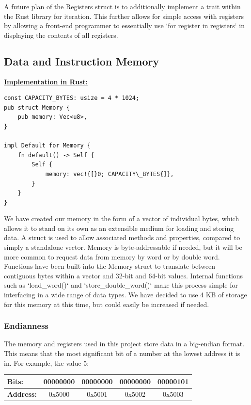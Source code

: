 \documentclass[
    parskip=half,
    fontsize=12pt,
    titlepage=firstiscover,
    toc=bibliography,
    numbers=endperiod
]{scrartcl}
\begin{document}

A future plan of the Registers struct is to additionally implement a
trait within the Rust library for iteration. This further allows for
simple access with registers by allowing a front-end programmer to
essentially use `for register in registers` in displaying the contents
of all registers.

\subsection{Data and Instruction Memory}

\underline{\textbf{Implementation in Rust:}}
\begin{verbatim}
const CAPACITY_BYTES: usize = 4 * 1024;
pub struct Memory {
    pub memory: Vec<u8>,
}

impl Default for Memory {
    fn default() -> Self {
        Self {
            memory: vec!{[}0; CAPACITY\_BYTES{]},
        }
    }
}
\end{verbatim}

We have created our memory in the form of a vector of individual bytes,
which allows it to stand on its own as an extensible medium for loading
and storing data. A struct is used to allow associated methods and
properties, compared to simply a standalone vector. Memory is
byte-addressable if needed, but it will be more common to request data
from memory by word or by double word. Functions have been built into
the Memory struct to translate between contiguous bytes within a vector
and 32-bit and 64-bit values. Internal functions such as `load\_word()`
and `store\_double\_word()` make this process simple for interfacing in
a wide range of data types. We have decided to use 4 KB of storage for
this memory at this time, but could easily be increased if needed.


\subsubsection{Endianness}


The memory and registers used in this project store data in a big-endian
format. This means that the most significant bit of a number at the
lowest address it is in. For example, the value 5:

\begin{tabularx}{\textwidth}{@{}|l|c|c|c|c|@{}}
    \hline
    \textbf{Bits:}    & 00000000 & 00000000 & 00000000 & 00000101 \\\hline
    \textbf{Address:} & 0x5000   & 0x5001   & 0x5002   & 0x5003 \\\hline
\end{tabularx}
\end{document}
